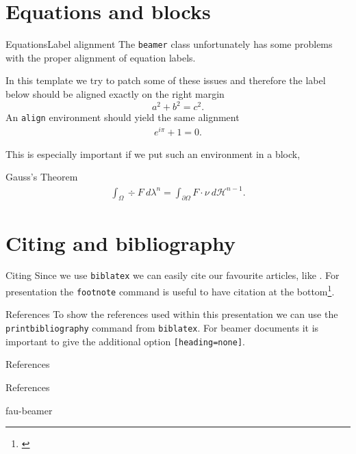 \section{Equations and blocks}
%
%
%
%
%
\begin{frame}{Equations}{Label alignment}
The \texttt{beamer} class unfortunately has some problems with the proper 
alignment of equation labels.

%
\pause
%
In this template we try to patch some of these issues and therefore the label 
below should be aligned exactly on the right margin
%
\begin{equation}\label{eq:pythagoras}
a^2 + b^2 = c^2.
\end{equation}
%
An \texttt{align} environment should yield the same alignment
%
\begin{align}\label{eq:euler}
e^{i\pi} +1= 0.
\end{align}

This is especially important if we put such an environment in a block,

\begin{block}{Gauss's Theorem}
\begin{align}\label{eq:gauss}
\int_\Omega \div F\ d\lambda^n = \int_{\partial\Omega} F\cdot \nu\ d\mathcal{H}^{n-1}.
\end{align}
\end{block}
\end{frame}
\section{Citing and bibliography}
%
%
%
%
%
\begin{frame}{Citing}
Since we use \texttt{biblatex} we can easily cite our favourite articles, like
\cite{bungert2021bregman, bungert2021neural}. For presentation the \texttt{footnote} command is useful to have citation at the bottom\footnote{\cite{bungert2021bregman}}.
\end{frame}
%
%
%
%
%
\begin{frame}{References}
To show the references used within this presentation we can use the \texttt{printbibliography} command from \texttt{biblatex}. For beamer documents it is important to give the additional option \texttt{[heading=none]}.
%
%
%
%
%
\begin{block}{References}
\printbibliography[heading=none]
\end{block}
\end{frame}

\begin{frame}{References}
\printbibliography[heading=none]
\end{frame}


%
%
%
%
%
\begin{frame}{fau-beamer}
%
\end{frame}
